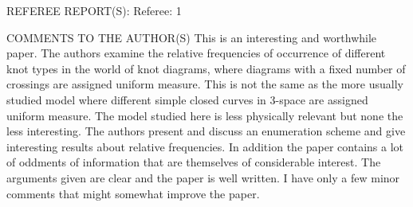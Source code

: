 \documentclass[12pt]{article}
\begin{document}
\pagestyle{empty}

REFEREE REPORT(S):
Referee: 1

COMMENTS TO THE AUTHOR(S) This is an interesting and worthwhile paper. The
authors examine the relative frequencies of occurrence of different knot types
in the world of knot diagrams, where diagrams with a fixed number of crossings
are assigned uniform measure. This is not the same as the more usually studied
model where different simple closed curves in 3-space are assigned uniform
measure. The model studied here is less physically relevant but none the less
interesting. The authors present and discuss an enumeration scheme and give
interesting results about relative frequencies. In addition the paper contains a
lot of oddments of information that are themselves of considerable interest. The
arguments given are clear and the paper is well written. I have only a few minor
comments that might somewhat improve the paper.
\end{document}
